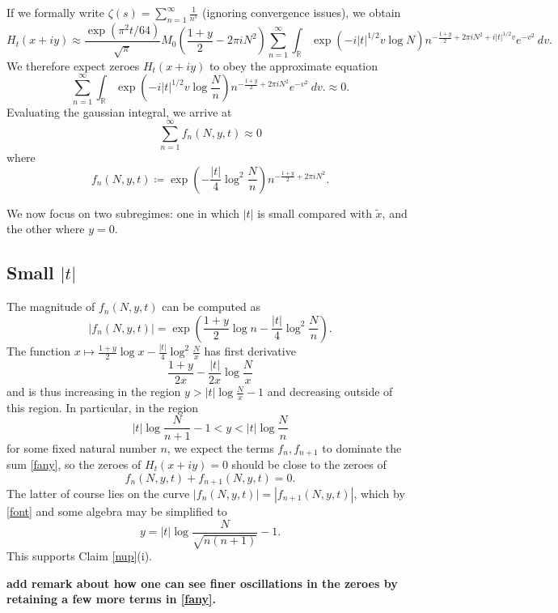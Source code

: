 \documentclass[a4paper,11pt,twoside]{amsart}
\newcommand\R{\mathbb{R}}
\begin{document}
If we formally write $\zeta(s) = \sum_{n=1}^\infty \frac{1}{n^s}$ (ignoring convergence issues), we obtain
$$
 H_t(x+iy) \approx \frac{\exp( \pi^2 t / 64)}{\sqrt{\pi}} M_0(\frac{1+y}{2}-2\pi i N^2) \sum_{n=1}^\infty \int_\R \exp( -i |t|^{1/2} v \log N ) n^{-\frac{1+y}{2}+2\pi i N^2 + i |t|^{1/2} v} e^{-v^2}\ dv.
$$
We therefore expect zeroes $H_t(x+iy)$ to obey the approximate equation
$$\sum_{n=1}^\infty \int_\R \exp( -i |t|^{1/2} v \log\frac{N}{n} ) n^{-\frac{1+y}{2}+2\pi i N^2} e^{-v^2}\ dv.
\approx 0.$$
Evaluating the gaussian integral, we arrive at
\begin{equation}\label{fany}
 \sum_{n=1}^\infty f_n(N,y,t) \approx 0 
\end{equation}
where
\begin{equation}\label{fn-def}
 f_n(N,y,t) \coloneqq \exp( -\frac{|t|}{4} \log^2 \frac{N}{n} ) n^{-\frac{1+y}{2}+2\pi i N^2}.
\end{equation}

We now focus on two subregimes: one in which $|t|$ is small compared with $\tilde x$, and the other where $y=0$.

\subsection{Small $|t|$} 

The magnitude of $f_n(N,y,t)$ can be computed as
\begin{equation}\label{font}
 |f_n(N,y,t)| = \exp( \frac{1+y}{2} \log n -\frac{|t|}{4} \log^2 \frac{N}{n} ).
\end{equation}
The function $x \mapsto \frac{1+y}{2} \log x -\frac{|t|}{4} \log^2 \frac{N}{x}$ has first derivative
$$ \frac{1+y}{2x} - \frac{|t|}{2x} \log \frac{N}{x}$$
and is thus increasing in the region $y > |t| \log \frac{N}{x} - 1$ and decreasing outside of this region.  In particular, in the region
$$ |t| \log \frac{N}{n+1} - 1 < y < |t| \log \frac{N}{n}$$
for some fixed natural number $n$, we expect the terms $f_n, f_{n+1}$ to dominate the sum \eqref{fany}, so the zeroes of $H_t(x+iy)=0$ should be close to the zeroes of
$$ f_n(N,y,t) + f_{n+1}(N,y,t) = 0.$$
The latter of course lies on the curve $|f_n(N,y,t)| = |f_{n+1}(N,y,t)|$, which by \eqref{font} and some algebra may be simplified to
$$ y = |t| \log \frac{N}{\sqrt{n(n+1)}} - 1.$$
This supports Claim \ref{nup}(i).

{\bf add remark about how one can see finer oscillations in the zeroes by retaining a few more terms in \eqref{fany}.}
\end{document}
